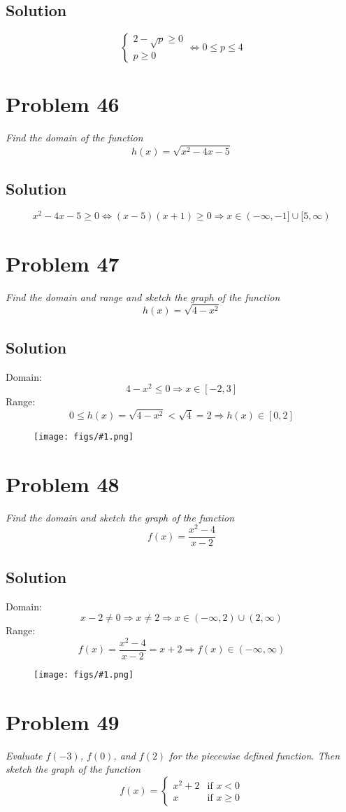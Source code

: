\documentclass[11pt]{article}
\newcommand{\soln}{\subsection*}
\newcommand{\qn}{\textit}
\newcommand{\imgsoln}[1]{
	\begin{figure}[H]
		\centering
		\texttt{[image: figs/\#1.png]}
	\end{figure}
}
\begin{document}
\soln{Solution}
\begin{equation*}
	\begin{cases}
		2 - \sqrt{p} \ge 0 \\
		p \ge 0
	\end{cases}
	\Leftrightarrow
	0 \le p \le 4
\end{equation*}

\section*{Problem 46}

\qn{Find the domain of the function $$h(x)=\sqrt{x^2-4x-5}$$}

\soln{Solution}
\begin{equation*}
	x^2-4x-5 \ge 0 \Leftrightarrow (x-5)(x+1) \ge 0 \Rightarrow x \in (-\infty,-1] \cup [5, \infty)
\end{equation*}

\section*{Problem 47}

\qn{Find the domain and range and sketch the graph of the function $$h(x)=\sqrt{4-x^2}$$}

\soln{Solution}
Domain: $$4-x^2 \le 0 \Rightarrow x \in [-2, 3]$$
Range: $$0 \le h(x)=\sqrt{4-x^2}<\sqrt{4}=2 \Rightarrow h(x) \in [0, 2]$$
\imgsoln{1.1.47-ans}

\section*{Problem 48}

\qn{Find the domain and sketch the graph of the function $$f(x)=\frac{x^2-4}{x-2}$$}

\soln{Solution}
Domain: $$x-2 \ne 0 \Rightarrow x \ne 2 \Rightarrow x \in (-\infty, 2) \cup (2, \infty)$$
Range: $$f(x)=\frac{x^2-4}{x-2}=x+2 \Rightarrow f(x) \in (-\infty, \infty)$$
\imgsoln{1.1.48-ans}

\section*{Problem 49}

\qn{Evaluate $f(-3)$, $f(0)$, and $f(2)$ for the piecewise defined function. Then sketch the graph of the function}
\begin{equation*}
	f(x)=
	\begin{cases}
		x^2+2 & \text{if } x < 0\\
		x & \text{if } x \ge 0
	\end{cases}
\end{equation*}
\end{document}
